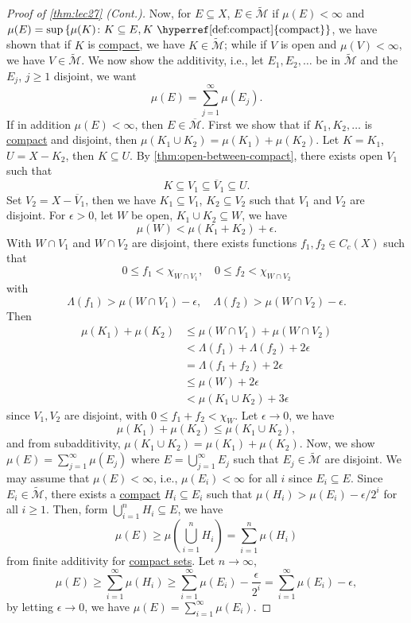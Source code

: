 \begin{proof}[Proof of \autoref{thm:lec27} (Cont.)]
	Now, for \(E \subseteq X\), \(E \in \widetilde{\mathcal{M}} \) if \(\mu (E) < \infty \) and \(\mu (E) = \sup \left\{ \mu (K) \colon K \subseteq E, K \text{ \hyperref[def:compact]{compact}}  \right\} \), we have shown that if \(K\) is \hyperref[def:compact]{compact}, we have \(K \in \widetilde{\mathcal{M}} \); while if \(V\) is open and \(\mu (V) < \infty \), we have \(V\in \widetilde{\mathcal{M}} \). We now show the additivity, i.e., let \(E_1, E_2, \ldots \) be in \( \widetilde{\mathcal{M}} \) and the \(E_j\), \(j\geq 1\) disjoint, we want
	\[
		\mu (E) = \sum_{j=1}^{\infty} \mu (E_j).
	\]
	If in addition \(\mu (E) < \infty \), then \(E \in \overline{\mathcal{M}}\). First we show that if \(K_1, K_2, \ldots  \) is \hyperref[def:compact]{compact} and disjoint, then \(\mu (K_1 \cup K_2) = \mu (K_1) + \mu (K_2)\). Let \(K = K_1\), \(U = X - K_2\), then \(K \subseteq U\). By \autoref{thm:open-between-compact}, there exists open \(V_1\) such that
	\[
		K \subseteq V_1 \subseteq \overline{V} _1 \subseteq U.
	\]
	Set \(V_2 = X - \overline{V} _1\), then we have \(K_1 \subseteq V_1\), \(K_2 \subseteq V_2\) such that \(V_1\) and \(V_2\) are disjoint. For \(\epsilon > 0\), let \(W\) be open, \(K_1 \cup K_2 \subseteq W\), we have
	\[
		\mu (W) < \mu (K_1 + K_2) + \epsilon.
	\]
	With \(W \cap V_1\) and \(W \cap V_2\) are disjoint, there exists functions \(f_1, f_2 \in C_c(X)\) such that
	\[
		0 \leq f_1 < \chi _{W \cap V_1}, \quad 0 \leq f_2 < \chi _{W \cap V_2}
	\]
	with
	\[
		\Lambda (f_1) > \mu (W \cap V_1) - \epsilon ,\quad \Lambda (f_2) > \mu (W \cap V_2) - \epsilon.
	\]
	Then
	\[
		\begin{split}
			\mu (K_1) + \mu (K_2)
			&\leq \mu (W \cap V_1) + \mu (W \cap V_2) \\
			&< \Lambda (f_1) + \Lambda (f_2) + 2\epsilon \\
			&= \Lambda (f_1 + f_2) + 2\epsilon \\
			&\leq \mu (W) + 2\epsilon \\
			&< \mu (K_1 \cup K_2) + 3\epsilon
		\end{split}
	\]
	since \(V_1, V_2\) are disjoint, with \(0 \leq f_1 + f_2 < \chi _W\). Let \(\epsilon \to 0\), we have
	\[
		\mu (K_1) + \mu (K_2) \leq \mu (K_1 \cup K_2),
	\]
	and from subadditivity, \(\mu (K_1 \cup K_2) = \mu (K_1) + \mu (K_2)\). Now, we show \(\mu (E) = \sum_{j=1}^{\infty} \mu (E_j)\) where \(E = \bigcup_{j=1}^{\infty} E_j\) such that \(E_j\in \widetilde{\mathcal{M}} \) are disjoint. We may assume that \(\mu (E) < \infty \), i.e., \(\mu (E_i) < \infty \) for all \(i\) since \(E_i \subseteq E\). Since \(E_i\in \widetilde{\mathcal{M}} \), there exists a \hyperref[def:compact]{compact} \(H_i \subseteq E_i\) such that \(\mu (H_i) > \mu (E_i) - \epsilon / 2^i\) for all \(i \geq 1\). Then, form \(\bigcup_{i=1}^{n} H_i \subseteq E\), we have
	\[
		\mu (E) \geq \mu \left( \bigcup_{i=1}^{n} H_i \right) = \sum_{i=1}^{n} \mu (H_i)
	\]
	from finite additivity for \hyperref[def:compact]{compact sets}. Let \(n \to \infty \),
	\[
		\mu (E)
		\geq \sum_{i=1}^{\infty} \mu (H_i)
		\geq \sum_{i=1}^{\infty} \mu (E_i) - \frac{\epsilon}{2^i}
		= \sum_{i=1}^{\infty} \mu (E_i) - \epsilon,
	\]
	by letting \(\epsilon \to 0\), we have \(\mu (E) = \sum_{i=1}^{\infty} \mu (E_i)\).


\end{proof}
